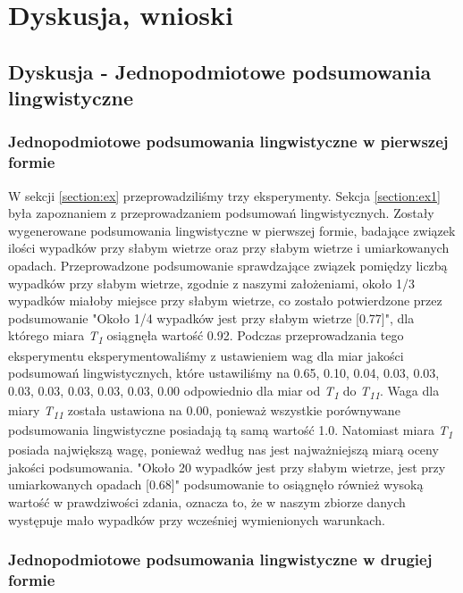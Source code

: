 \documentclass{classrep}
\begin{document}
\newpage


\section{Dyskusja, wnioski}
\subsection{Dyskusja - Jednopodmiotowe podsumowania lingwistyczne}

\subsubsection{Jednopodmiotowe podsumowania lingwistyczne w pierwszej formie}

W sekcji \ref{section:ex} przeprowadziliśmy trzy eksperymenty. Sekcja \ref{section:ex1} była zapoznaniem z przeprowadzaniem podsumowań lingwistycznych. Zostały wygenerowane podsumowania lingwistyczne w pierwszej formie, badające związek ilości wypadków przy słabym wietrze oraz przy słabym wietrze i umiarkowanych opadach. Przeprowadzone podsumowanie sprawdzające związek pomiędzy liczbą wypadków przy słabym wietrze, zgodnie z naszymi założeniami, około 1/3 wypadków miałoby miejsce przy słabym wietrze, co zostało potwierdzone przez podsumowanie "Około 1/4 wypadków jest przy słabym wietrze [0.77]", dla którego miara \textit{T\textsubscript{1}} osiągnęła wartość 0.92. Podczas przeprowadzania tego eksperymentu eksperymentowaliśmy z ustawieniem wag dla miar jakości podsumowań lingwistycznych, które ustawiliśmy na 0.65, 0.10, 0.04, 0.03, 0.03, 0.03, 0.03, 0.03, 0.03, 0.03, 0.00 odpowiednio dla miar od \textit{T\textsubscript{1}} do \textit{T\textsubscript{11}}. Waga dla miary \textit{T\textsubscript{11}} została ustawiona na 0.00, ponieważ wszystkie porównywane podsumowania lingwistyczne posiadają tą samą wartość 1.0. Natomiast miara \textit{T\textsubscript{1}} posiada największą wagę, ponieważ według nas jest najważniejszą miarą oceny jakości podsumowania. "Około 20 wypadków jest przy słabym wietrze, jest przy umiarkowanych opadach [0.68]" podsumowanie to osiągnęło również wysoką wartość w prawdziwości zdania, oznacza to, że w naszym zbiorze danych występuje mało wypadków przy wcześniej wymienionych warunkach. \\

\subsubsection{Jednopodmiotowe podsumowania lingwistyczne w drugiej formie}
\end{document}

